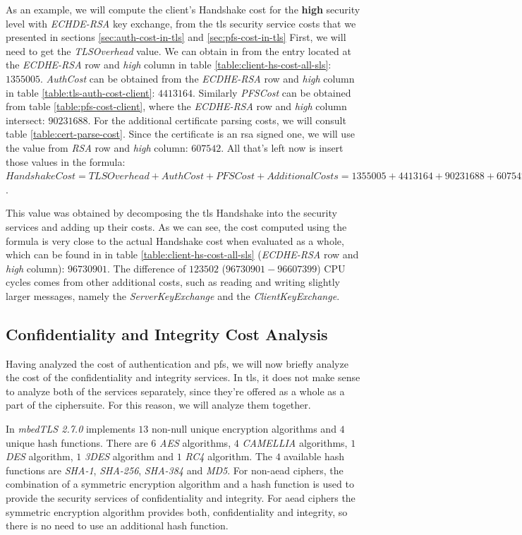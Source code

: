 \documentclass{llncs}
\begin{document}
As an example, we will compute the client's Handshake cost for the \textbf{high} security level with \textit{ECHDE-RSA}
key exchange, from the \gls{tls} security service costs that we presented in sections \ref{sec:auth-cost-in-tls} and \ref{sec:pfs-cost-in-tls}
First, we will need to get the \textit{TLSOverhead} value. We can obtain in from the entry located at the
\textit{ECDHE-RSA} row and \textit{high} column in table \ref{table:client-hs-cost-all-sls}: $1355005$. \textit{AuthCost} can be obtained
from the \textit{ECDHE-RSA} row and \textit{high} column in table \ref{table:tls-auth-cost-client}: $4413164$. Similarly \textit{PFSCost}
can be obtained from table \ref{table:pfs-cost-client}, where the \textit{ECDHE-RSA} row and \textit{high} column intersect: $90231688$.
For the additional certificate parsing costs, we will consult table \ref{table:cert-parse-cost}. Since the certificate is an \gls{rsa} signed one,
we will use the value from \textit{RSA} row and \textit{high} column: $607542$. All that's left now is insert those values in the formula:
$Handshake Cost = TLS Overhead + Auth Cost + PFS Cost + Additional Costs = 1355005 + 4413164 + 90231688 + 607542 = 96607399$.

This value was obtained by decomposing the \gls{tls} Handshake into the security services and adding up their costs. As we can see,
the cost computed using the formula is very close to the actual Handshake cost when evaluated as a whole,
which can be found in in table \ref{table:client-hs-cost-all-sls} (\textit{ECDHE-RSA} row and \textit{high} column): $96730901$.
The difference of $123502$ ($96730901-96607399$) CPU cycles comes from other additional costs, such as reading and writing slightly larger
messages, namely the \textit{ServerKeyExchange} and the \textit{ClientKeyExchange}.

\subsection{Confidentiality and Integrity Cost Analysis} \label{sec:confid-costs}

Having analyzed the cost of authentication and \gls{pfs}, we will now briefly analyze the cost of the confidentiality and integrity services.
In \gls{tls}, it does not make sense to analyze both of the services separately, since they're offered as a whole as a part of the ciphersuite.
For this reason, we will analyze them together.

In \textit{mbedTLS 2.7.0} implements $13$ non-null unique encryption algorithms and $4$ unique hash functions. There are $6$ \textit{AES} 
algorithms, $4$ \textit{CAMELLIA} algorithms,
$1$ \textit{DES} algorithm, $1$ \textit{3DES} algorithm and $1$ \textit{RC4} algorithm. The $4$ available hash functions are \textit{SHA-1}, 
\textit{SHA-256}, \textit{SHA-384} and \textit{MD5}.
For non-\gls{aead} ciphers, the combination of a symmetric encryption algorithm and a hash function is used to provide the security services of confidentiality and 
integrity. For \gls{aead} ciphers the symmetric encryption algorithm provides both, confidentiality and integrity, so there is no need
to use an additional hash function.
\end{document}
